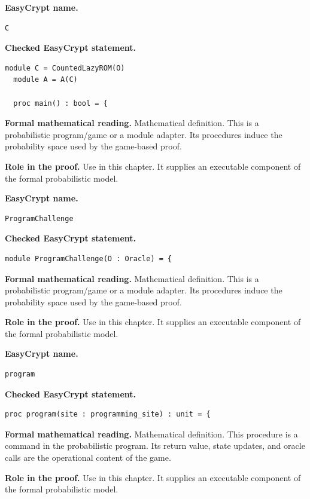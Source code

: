 \begin{formaldefinition}
\noindent\textbf{EasyCrypt name.}
\begin{lstlisting}[language=EasyCrypt,basicstyle=\ttfamily\scriptsize]
C
\end{lstlisting}
\noindent\textbf{Checked EasyCrypt statement.}
\begin{lstlisting}[language=EasyCrypt,basicstyle=\ttfamily\scriptsize]
module C = CountedLazyROM(O)
  module A = A(C)

  proc main() : bool = {
\end{lstlisting}
\noindent\textbf{Formal mathematical reading.}
Mathematical definition. This is a probabilistic program/game or a module adapter.  Its procedures induce the probability space used by the game-based proof.

\noindent\textbf{Role in the proof.}
Use in this chapter. It supplies an executable component of the formal probabilistic model.

\end{formaldefinition}

\begin{formaldefinition}
\noindent\textbf{EasyCrypt name.}
\begin{lstlisting}[language=EasyCrypt,basicstyle=\ttfamily\scriptsize]
ProgramChallenge
\end{lstlisting}
\noindent\textbf{Checked EasyCrypt statement.}
\begin{lstlisting}[language=EasyCrypt,basicstyle=\ttfamily\scriptsize]
module ProgramChallenge(O : Oracle) = {
\end{lstlisting}
\noindent\textbf{Formal mathematical reading.}
Mathematical definition. This is a probabilistic program/game or a module adapter.  Its procedures induce the probability space used by the game-based proof.

\noindent\textbf{Role in the proof.}
Use in this chapter. It supplies an executable component of the formal probabilistic model.

\end{formaldefinition}

\begin{formaldefinition}
\noindent\textbf{EasyCrypt name.}
\begin{lstlisting}[language=EasyCrypt,basicstyle=\ttfamily\scriptsize]
program
\end{lstlisting}
\noindent\textbf{Checked EasyCrypt statement.}
\begin{lstlisting}[language=EasyCrypt,basicstyle=\ttfamily\scriptsize]
proc program(site : programming_site) : unit = {
\end{lstlisting}
\noindent\textbf{Formal mathematical reading.}
Mathematical definition. This procedure is a command in the probabilistic program.  Its return value, state updates, and oracle calls are the operational content of the game.

\noindent\textbf{Role in the proof.}
Use in this chapter. It supplies an executable component of the formal probabilistic model.

\end{formaldefinition}


